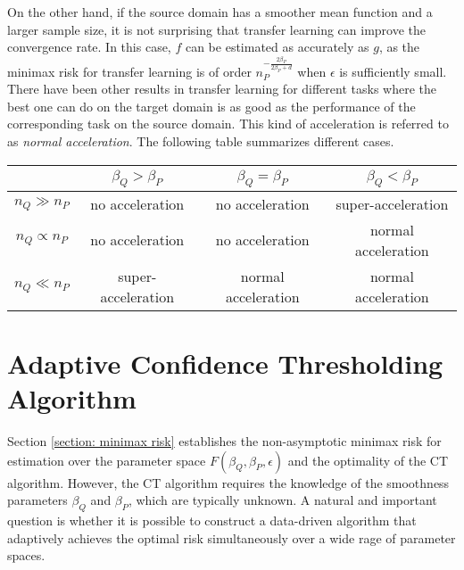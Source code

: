 \documentclass{article}
\begin{document}
\begin{itemize}
On the other hand, if the source domain has a smoother mean function and a larger sample size, it is not surprising that transfer learning can improve the convergence rate. In this case, $f$ can be estimated as accurately as $g$, as the minimax risk for transfer learning
is of order $n_P^{-\frac{2\beta_P}{2\beta_P+d}}$ when $\epsilon$ is sufficiently small. There have been other results in transfer learning for different tasks where the best one can do on the target domain is as good as the performance of the corresponding task on the source domain. This kind of acceleration is referred to as {\it normal acceleration}.
The following table summarizes different cases.
\end{itemize}

\vspace{-15pt}
\begin{center}
\begin{tabular}{|c|c|c|c|}
\hline
  & $\beta_Q > \beta_P$ & $\beta_Q=\beta_P$ & $\beta_Q<\beta_P$ \\
\hline
$n_Q\gg n_{P}$  &no acceleration & no acceleration & super-acceleration\\
\hline 
$n_Q\propto n_{P}$ &no acceleration &no acceleration & normal acceleration\\
\hline
$n_Q\ll  n_{P}$ & super-acceleration& normal acceleration &normal acceleration\\
\hline
\end{tabular}
\end{center}




\section{Adaptive Confidence Thresholding Algorithm}
\label{section: adaptive alg}

Section \ref{section: minimax risk} establishes  the non-asymptotic minimax risk  for estimation over the parameter space $F(\beta_Q,\beta_P,\epsilon)$ and the optimality of the CT algorithm. However, the CT algorithm requires the knowledge of the smoothness parameters $\beta_Q$ and $\beta_P$, which are typically unknown. A natural and  important question is whether it is possible to construct a data-driven algorithm that adaptively achieves the optimal risk simultaneously over a wide rage of parameter spaces.
\end{document}
